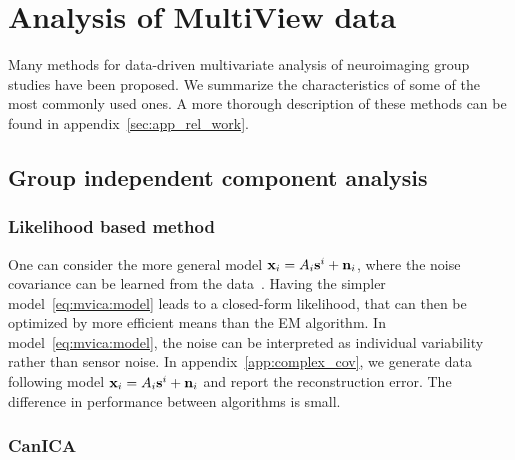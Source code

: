 \documentclass{report}
\begin{document}
\section{Analysis of MultiView data}
Many methods for data-driven multivariate analysis of neuroimaging group studies have been proposed. We summarize the characteristics of some of the most commonly used ones. A more thorough description of these methods can be found in appendix~\ref{sec:app_rel_work}.
\subsection{Group independent component analysis}
\subsubsection{Likelihood based method}
One can consider the more general model $\mathbf{x}_i = A_i\mathbf{s}^i + \mathbf{n}_i$, where the noise covariance can be learned from the data~\cite{guo2008unified}.
% 
Having the simpler model~\eqref{eq:mvica:model} leads to a closed-form likelihood, that can then be optimized by more efficient means than the EM algorithm.
In model~\eqref{eq:mvica:model}, the noise can be interpreted as individual variability rather than sensor noise. %
In appendix~\ref{app:complex_cov}, we generate data following model $\mathbf{x}_i = A_i\mathbf{s}^i + \mathbf{n}_i$ and report the reconstruction error. The difference in performance between algorithms is small. 
\subsubsection{CanICA}
\cite{varoquaux2009canica}
\end{document}
